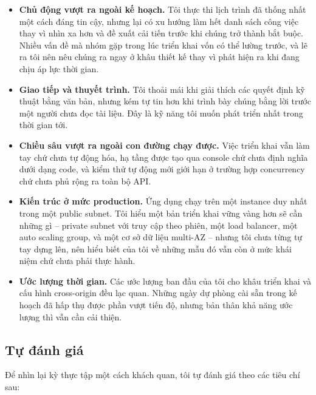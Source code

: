 \begin{itemize}
    \setlength\itemsep{0.2em}
    \item \textbf{Chủ động vượt ra ngoài kế hoạch.} Tôi thực thi lịch trình đã
    thống nhất một cách đáng tin cậy, nhưng lại có xu hướng làm hết danh sách
    công việc thay vì nhìn xa hơn và đề xuất cải tiến trước khi chúng trở thành
    bắt buộc. Nhiều vấn đề mà nhóm gặp trong lúc triển khai vốn có thể lường
    trước, và lẽ ra tôi nên nêu chúng ra ngay ở khâu thiết kế thay vì phát hiện
    ra khi đang chịu áp lực thời gian.

    \item \textbf{Giao tiếp và thuyết trình.} Tôi thoải mái khi giải thích các
    quyết định kỹ thuật bằng văn bản, nhưng kém tự tin hơn khi trình bày chúng
    bằng lời trước một người chưa đọc tài liệu. Đây là kỹ năng tôi muốn phát
    triển nhất trong thời gian tới.

    \item \textbf{Chiều sâu vượt ra ngoài con đường chạy được.} Việc triển khai
    vẫn làm tay chứ chưa tự động hóa, hạ tầng được tạo qua console chứ chưa định
    nghĩa dưới dạng code, và kiểm thử tự động mới giới hạn ở trường hợp
    concurrency chứ chưa phủ rộng ra toàn bộ API.

    \item \textbf{Kiến trúc ở mức production.} Ứng dụng chạy trên một instance
    duy nhất trong một public subnet. Tôi hiểu một bản triển khai vững vàng hơn
    sẽ cần những gì -- private subnet với truy cập theo phiên, một load
    balancer, một auto scaling group, và một cơ sở dữ liệu multi-AZ -- nhưng tôi
    chưa từng tự tay dựng lên, nên hiểu biết của tôi về những mẫu đó vẫn còn ở
    mức khái niệm chứ chưa phải thực hành.

    \item \textbf{Ước lượng thời gian.} Các ước lượng ban đầu của tôi cho khâu
    triển khai và cấu hình cross-origin đều lạc quan. Những ngày dự phòng cài
    sẵn trong kế hoạch đã hấp thụ được phần vượt tiến độ, nhưng bản thân khả
    năng ước lượng thì vẫn cần cải thiện.
\end{itemize}

\subsection{Tự đánh giá}

Để nhìn lại kỳ thực tập một cách khách quan, tôi tự đánh giá theo các tiêu chí
sau:

